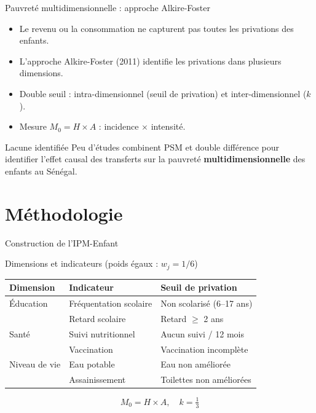 \documentclass[10pt,aspectratio=169]{beamer}
\begin{document}
\begin{frame}{Pauvreté multidimensionnelle : approche Alkire-Foster}
  \begin{itemize}
    \item Le revenu ou la consommation ne capturent pas toutes les privations des enfants.
    \item L'approche Alkire-Foster (2011) identifie les privations dans plusieurs dimensions.
    \item Double seuil : intra-dimensionnel (seuil de privation) et inter-dimensionnel ($k$).
    \item Mesure $M_0 = H \times A$ : incidence $\times$ intensité.
  \end{itemize}
  \begin{alertblock}{Lacune identifiée}
    Peu d'études combinent PSM et double différence pour identifier l'effet causal
    des transferts sur la pauvreté \textbf{multidimensionnelle} des enfants au Sénégal.
  \end{alertblock}
\end{frame}

\section[Méthodo]{Méthodologie}

\begin{frame}{Construction de l'IPM-Enfant}
  \begin{block}{Dimensions et indicateurs (poids égaux : $w_j = 1/6$)}
    \centering\smallskip
    \begin{tabular}{lll}
      \toprule
      Dimension     & Indicateur              & Seuil de privation \\
      \midrule
      Éducation     & Fréquentation scolaire  & Non scolarisé (6--17 ans) \\
                    & Retard scolaire         & Retard $\geq$ 2 ans \\
      Santé         & Suivi nutritionnel      & Aucun suivi / 12 mois \\
                    & Vaccination             & Vaccination incomplète \\
      Niveau de vie & Eau potable             & Eau non améliorée \\
                    & Assainissement          & Toilettes non améliorées \\
      \bottomrule
    \end{tabular}
  \end{block}
  \begin{equation*}
    M_0 = H \times A, \quad k = \tfrac{1}{3}
  \end{equation*}
\end{frame}
\end{document}
